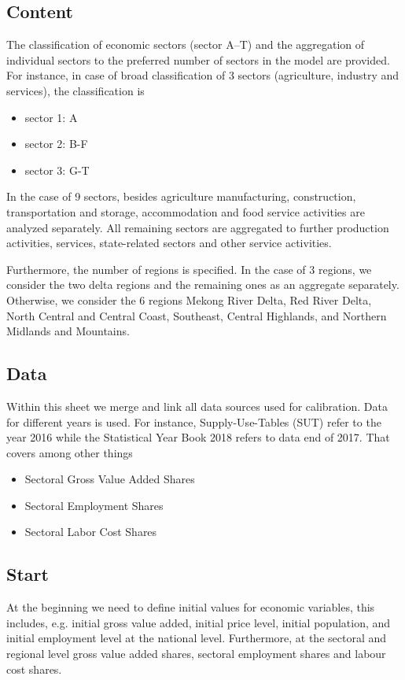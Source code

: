 \documentclass[10pt,a4paper]{article}
\begin{document}
\subsection{Content}
The classification of economic sectors (sector A--T) 
and the aggregation of individual sectors to the preferred number of sectors in the model are provided. For instance, in case of broad classification of 3 sectors (agriculture, industry and services), the classification is
\begin{itemize}
\item sector 1:	A
\item sector 2:	B-F
\item sector 3:	G-T
\end{itemize}
In the case of 9 sectors, besides agriculture manufacturing, construction, transportation and storage, accommodation and food service activities are analyzed separately. All remaining sectors are aggregated to further production activities, services, state-related sectors and other service activities.

Furthermore, the number of regions is specified. In the case of 3 regions, we consider the two delta regions and the remaining ones as an aggregate separately. Otherwise, we consider the 6 regions Mekong River Delta, Red River Delta, North Central and Central Coast, Southeast, Central Highlands, and Northern Midlands and Mountains.


 
\subsection{Data}

Within this sheet we merge and link all data sources used for calibration. Data for different years is used. For instance, Supply-Use-Tables (SUT) refer to the year 2016 while the Statistical Year Book 2018 refers to data end of 2017.
That covers among other things 
\begin{itemize}
	\item Sectoral Gross Value Added Shares
	\item Sectoral Employment Shares
	\item Sectoral Labor Cost Shares
\end{itemize}



\subsection{Start}
At the beginning we need to define initial values for economic variables, this includes, e.g. initial gross value added, initial price level, initial population, and initial employment level at the national level. Furthermore, at the sectoral and regional level gross value added shares, sectoral employment shares and labour cost shares.
\end{document}
